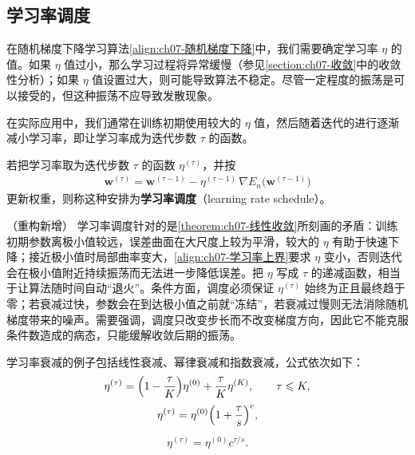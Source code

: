 \documentclass[../../main.tex]{subfiles}
\begin{document}
\subsection{学习率调度}\label{subsection:ch07-学习率调度}

在随机梯度下降学习算法\eqref{align:ch07-随机梯度下降}中，我们需要确定学习率 $\eta$ 的值。如果 $\eta$ 值过小，那么学习过程将异常缓慢（参见\cref{section:ch07-收敛}中的收敛性分析）；如果 $\eta$ 值设置过大，则可能导致算法不稳定。尽管一定程度的振荡是可以接受的，但这种振荡不应导致发散现象。

在实际应用中，我们通常在训练初期使用较大的 $\eta$ 值，然后随着迭代的进行逐渐减小学习率，即让学习率成为迭代步数 $\tau$ 的函数。

\begin{definition}[学习率调度]\label{definition:ch07-学习率调度}
若把学习率取为迭代步数 $\tau$ 的函数 $\eta^{(\tau)}$，并按
\begin{align}
\mathbf{w}^{(\tau)} = \mathbf{w}^{(\tau-1)}-\eta^{(\tau-1)}\,\nabla E_n\bigl(\mathbf{w}^{(\tau-1)}\bigr)
\label{align:ch07-学习率调度}
\end{align}
更新权重，则称这种安排为\textbf{学习率调度}（learning rate schedule）。
\end{definition}

\begin{remark}（重构新增）
学习率调度针对的是\cref{theorem:ch07-线性收敛}所刻画的矛盾：训练初期参数离极小值较远，误差曲面在大尺度上较为平滑，较大的 $\eta$ 有助于快速下降；接近极小值时局部曲率变大，\eqref{align:ch07-学习率上界}要求 $\eta$ 变小，否则迭代会在极小值附近持续振荡而无法进一步降低误差。把 $\eta$ 写成 $\tau$ 的递减函数，相当于让算法随时间自动“退火”。条件方面，调度必须保证 $\eta^{(\tau)}$ 始终为正且最终趋于零；若衰减过快，参数会在到达极小值之前就“冻结”，若衰减过慢则无法消除随机梯度带来的噪声。需要强调，调度只改变步长而不改变梯度方向，因此它不能克服条件数造成的病态，只能缓解收敛后期的振荡。
\end{remark}

学习率衰减的例子包括线性衰减、幂律衰减和指数衰减，公式依次如下：
\begin{align}
\eta^{(\tau)} = \Bigl(1-\frac{\tau}{K}\Bigr)\eta^{(0)}+\frac{\tau}{K}\eta^{(K)},\qquad \tau\leqslant K,
\label{align:ch07-线性衰减}
\end{align}
\begin{align}
\eta^{(\tau)} = \eta^{(0)}\Bigl(1+\frac{\tau}{s}\Bigr)^{c},
\label{align:ch07-幂律衰减}
\end{align}
\begin{align}
\eta^{(\tau)} = \eta^{(0)}c^{\tau/s}.
\label{align:ch07-指数衰减}
\end{align}
\end{document}
